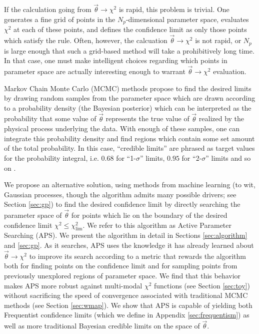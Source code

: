 \documentclass[useAMS,usenatbib]{aastex}
\begin{document}
If the calculation going from $\vec{\theta}\rightarrow\chi^2$ is rapid, this
problem is trivial.  One generates a fine grid of points in the 
$N_p$-dimensional parameter space, evaluates $\chi^2$ at each of these points, 
and defines the confidence limit as only those points which satisfy the rule.  
Often, however, the calcuation $\vec{\theta}\rightarrow\chi^2$ is not rapid, or $N_p$
is large enough that such a grid-based method will take a prohibitively long
time.  In that case, one must make intelligent choices regarding which points in
parameter space are actually interesting enough to warrant
 $\vec{\theta}\rightarrow\chi^2$ evaluation.

Markov Chain Monte Carlo (MCMC) methods propose to find the desired
limits by drawing random samples from the parameter space which are drawn
according to a probability density (the Bayesian posterior) which can be
interpreted as the probability that some value of $\vec{\theta}$ represents the
true value of $\vec{\theta}$ realized by the physical process underlying
the data.  
With enough of these samples, one can integrate this
probability density and find regions which contain some set amount of the total
probability.  In this case, ``credible limits'' are phrased as target values
for the probability integral, i.e. 
$0.68$ for ``1-$\sigma$'' limits, $0.95$ for ``2-$\sigma$'' limits
and so on \cite{mcmc}.

We propose an alternative solution, using methods from machine learning
(to wit, Gaussian processes, though the algorithm admits many possible drivers; see
Section \ref{sec:gp})
to find the desired confidence limit by directly searching the
parameter space of $\vec{\theta}$ for points which lie on the boundary of the
desired confidence limit $\chi^2\le\chi^2_\text{lim}$.  
We refer to this algorithm as Active Parameter Searching (APS).
We present the algorithm in detail in Sections \ref{sec:algorithm} and
\ref{sec:gp}.
As it searches, APS uses
the knowledge it has already learned about $\vec{\theta}\rightarrow\chi^2$ 
to improve its search according to a metric that rewards the
algorithm both for finding points on the confidence limit and for sampling
points from previously unexplored regions of parameter space.  We find that this
behavior makes APS more robust against multi-modal $\chi^2$ functions (see
Section \ref{sec:toy}) without
sacrificing the speed of convergence 
associated with traditional MCMC methods (see Section \ref{sec:wmap}).
We show that APS is capable of yielding both Frequentist confidence
limits (which we define in Appendix \ref{sec:frequentism}) as well as more traditional
Bayesian credible limits on the space of $\vec{\theta}$.
\end{document}

